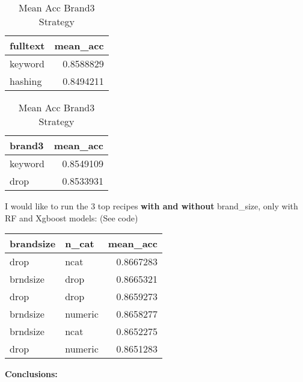 \documentclass[
]{article}
\begin{document}
\begin{table}[!htb]
\centering
\begin{minipage}{0.48\linewidth}
\caption{\label{tab:1}Mean Acc Fulltext Strategy}

\centering\begingroup\fontsize{8}{10}\selectfont

\begin{tabular}{lr}
\toprule
fulltext & mean\_acc\\
\midrule
\rowcolor{gray!6}  keyword & 0.8588829\\
hashing & 0.8494211\\
\bottomrule
\end{tabular}
\endgroup{}
\end{minipage}
\begin{minipage}{0.48\linewidth}
\caption{\label{tab:2}Mean Acc Brand3 Strategy}
\centering\begingroup\fontsize{8}{10}\selectfont

\begin{tabular}{lr}
\toprule
brand3 & mean\_acc\\
\midrule
\rowcolor{gray!6}  keyword & 0.8549109\\
drop & 0.8533931\\
\bottomrule
\end{tabular}
\endgroup{}
\end{minipage}
\end{table}

I would like to run the 3 top recipes \textbf{with and without}
brand\_size, only with RF and Xgboost models: (See code)

\begin{table}[H]
\centering\begingroup\fontsize{8}{10}\selectfont

\begin{tabular}{llr}
\toprule
brandsize & n\_cat & mean\_acc\\
\midrule
\rowcolor{gray!6}  drop & ncat & 0.8667283\\
brndsize & drop & 0.8665321\\
\rowcolor{gray!6}  drop & drop & 0.8659273\\
brndsize & numeric & 0.8658277\\
\rowcolor{gray!6}  brndsize & ncat & 0.8652275\\
\addlinespace
drop & numeric & 0.8651283\\
\bottomrule
\end{tabular}
\endgroup{}
\end{table}

\textbf{Conclusions:}
\end{document}

